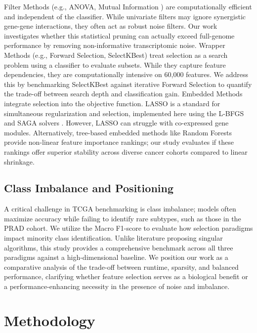 \documentclass{article}
\begin{document}
Filter Methods (e.g., ANOVA, Mutual Information \cite{mutual_info}) are computationally efficient and independent of the classifier. While univariate filters may ignore synergistic gene-gene interactions, they often act as robust noise filters. Our work investigates whether this statistical pruning can actually exceed full-genome performance by removing non-informative transcriptomic noise. Wrapper Methods (e.g., Forward Selection, SelectKBest) treat selection as a search problem using a classifier to evaluate subsets. While they capture feature dependencies, they are computationally intensive on 60,000 features. We address this by benchmarking SelectKBest against iterative Forward Selection to quantify the trade-off between search depth and classification gain. Embedded Methods integrate selection into the objective function. LASSO \cite{lasso_foundational} is a standard for simultaneous regularization and selection, implemented here using the L-BFGS and SAGA solvers \cite{saga_solver}. However, LASSO can struggle with co-expressed gene modules. Alternatively, tree-based embedded methods like Random Forests provide non-linear feature importance rankings; our study evaluates if these rankings offer superior stability across diverse cancer cohorts compared to linear shrinkage.

\subsection{Class Imbalance and Positioning}

A critical challenge in TCGA benchmarking is class imbalance; models often maximize accuracy while failing to identify rare subtypes, such as those in the PRAD cohort. We utilize the Macro F1-score to evaluate how selection paradigms impact minority class identification. Unlike literature proposing singular algorithms, this study provides a comprehensive benchmark across all three paradigms against a high-dimensional baseline. We position our work as a comparative analysis of the trade-off between runtime, sparsity, and balanced performance, clarifying whether feature selection serves as a biological benefit or a performance-enhancing necessity in the presence of noise and imbalance.










\section{Methodology}
\end{document}
